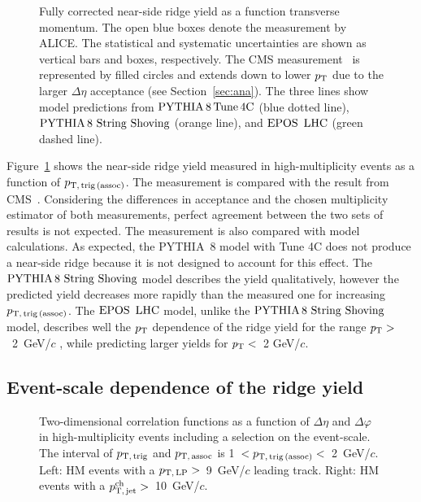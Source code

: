 \begin{figure}[h!]
	\centering
	\caption{ Fully corrected near-side ridge yield as a function transverse momentum. The open blue boxes denote the measurement by ALICE. The statistical and systematic uncertainties are shown as vertical bars and boxes, respectively. The CMS measurement~\cite{Khachatryan:2015lva} is represented by filled circles and extends down to lower $p_\mathrm{T}$ due to the larger $\Delta\eta$ acceptance (see Section~\ref{sec:ana}). The three lines show model predictions from $\mathrm{PYTHIA}\,8\,\mathrm{Tune\,4C}$ (blue dotted line), ${\mathrm{PYTHIA}\,8~\mathrm{String}~}\mathrm{Shoving}$ (orange line), and ${\mathrm{EPOS}\,~\mathrm{LHC}}$ (green dashed line).}
	\label{fig:PlotYSpect}
\end{figure}

Figure~\ref{fig:PlotYSpect} shows the near-side ridge yield measured in high-multiplicity events as a function of $p_\mathrm{T,\,trig\,(assoc)}$. The measurement is compared with the result from CMS~\cite{Khachatryan:2015lva}.
Considering the differences in acceptance and the chosen multiplicity estimator of both measurements, perfect agreement between the two sets of results is not expected. The measurement is also compared with model calculations. As expected, the PYTHIA~8 model with Tune 4C does not produce a near-side ridge because it is not designed to account for this effect. The ${\mathrm{PYTHIA}\,8~\mathrm{String}~}\mathrm{Shoving}$ model describes the yield qualitatively, however the predicted yield decreases more rapidly than the measured one for increasing $p_\mathrm{T,\,trig\,(assoc)}$. The ${\mathrm{EPOS}\,~\mathrm{LHC}}$ model, unlike the ${\mathrm{PYTHIA}\,8~\mathrm{String}~}\mathrm{Shoving}$ model, describes well the $p_\mathrm{T}$ dependence of the ridge yield for the range $\it{p}_{\rm{T}}>$~2~GeV/$c$ , while predicting larger yields for $\it{p}_{\rm{T}}<$~2 GeV/$c$.

\subsection{Event-scale dependence of the ridge yield}
\begin{figure}[h!]
	\centering
	\caption{ Two-dimensional correlation functions as a function of $\Delta\eta$ and $\Delta\varphi$ in high-multiplicity events including a selection on the event-scale. The interval of $p_\mathrm{T,\,trig}$ and $p_\mathrm{T,\,assoc}$ is 1~$<p_\mathrm{T,\,trig\,(assoc)}<$~2~GeV/$c$. Left: HM events with a $p_\mathrm{T,\,LP}>$~9~GeV/$c$ leading track. Right: HM events with a $p_\mathrm{T,\,jet}^\mathrm{ch}>$~10~GeV/$c$.}
	\label{fig:PlotCorrHMTSel}
\end{figure}

